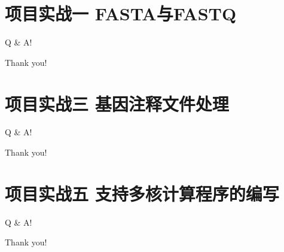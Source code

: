 \documentclass{beamer}
\begin{document}
\section{项目实战一 FASTA与FASTQ}



\begin{frame}[standout] Q \& A! \end{frame}
\begin{frame}[standout] Thank you! \end{frame}

\section{项目实战三 基因注释文件处理}



\begin{frame}[standout] Q \& A! \end{frame}
\begin{frame}[standout] Thank you! \end{frame}

\section{项目实战五 支持多核计算程序的编写}




\begin{frame}[standout] Q \& A! \end{frame}
\begin{frame}[standout] Thank you! \end{frame}
\end{document}
